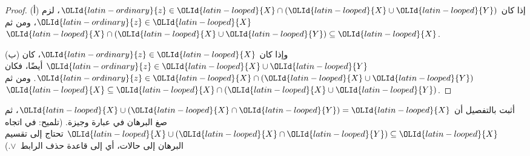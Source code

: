 \documentclass[../../../include/open-logic-section]{subfiles}
\begin{document}
\begin{proof}
(أ) إذا كان $\OLId{latin-ordinary}{z} \in \OLId{latin-looped}{X} \cap (\OLId{latin-looped}{X} \cup \OLId{latin-looped}{Y})$، لزم $\OLId{latin-ordinary}{z} \in \OLId{latin-looped}{X}$، ومن ثم
  $\OLId{latin-looped}{X} \cap (\OLId{latin-looped}{X} \cup \OLId{latin-looped}{Y}) \subseteq \OLId{latin-looped}{X}$.

(ب) وإذا كان $\OLId{latin-ordinary}{z} \in \OLId{latin-looped}{X}$، كان $\OLId{latin-ordinary}{z} \in \OLId{latin-looped}{X} \cup \OLId{latin-looped}{Y}$ أيضًا، فكان
  $\OLId{latin-ordinary}{z} \in \OLId{latin-looped}{X} \cap (\OLId{latin-looped}{X} \cup \OLId{latin-looped}{Y})$. ومن ثم
  $\OLId{latin-looped}{X} \subseteq \OLId{latin-looped}{X} \cap (\OLId{latin-looped}{X} \cup \OLId{latin-looped}{Y})$.
\end{proof}

\begin{prob}
أثبت بالتفصيل أن $\OLId{latin-looped}{X} \cup (\OLId{latin-looped}{X} \cap \OLId{latin-looped}{Y}) = \OLId{latin-looped}{X}$، ثم صغ البرهان في عبارة
وجيزة. (تلميح: في اتجاه $\OLId{latin-looped}{X} \cup (\OLId{latin-looped}{X} \cap \OLId{latin-looped}{Y}) \subseteq \OLId{latin-looped}{X}$ تحتاج
إلى تقسيم البرهان إلى حالات، أي إلى قاعدة حذف الرابط~$\lor$.)
\end{prob}
\end{document}
